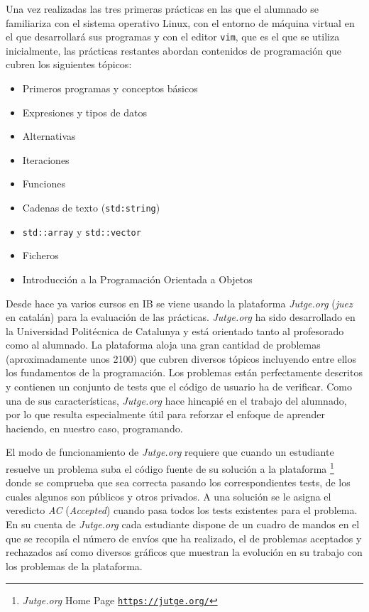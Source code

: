 \documentclass[twocolumn,twoside,a4paper, 10pt]{article}
\newcommand{\jutge}{\textit{Jutge.org}{}}           %
\begin{document}
Una vez realizadas las tres primeras prácticas en las que el alumnado se familiariza con el sistema operativo
Linux, con el entorno de máquina virtual en el que desarrollará sus programas y con el editor \texttt{vim}, 
que es el que se utiliza inicialmente, las prácticas restantes abordan contenidos de programación que
cubren los siguientes tópicos:
\begin{itemize}
  \item Primeros programas y conceptos básicos
  \item Expresiones y tipos de datos
  \item Alternativas
  \item Iteraciones
  \item Funciones
  \item Cadenas de texto (\texttt{std:string})
  \item \texttt{std::array} y \texttt{std::vector}
  \item Ficheros
  \item Introducción a la Programación Orientada a Objetos
\end{itemize}

Desde hace ya varios cursos en IB se viene usando la plataforma \jutge{} (\textit{juez} en catalán) 
\cite{Petit:Jutge:2018} para la evaluación de las prácticas.
\jutge{} ha sido desarrollado en la Universidad Politécnica de Catalunya y está orientado tanto al profesorado 
como al alumnado.
La plataforma aloja una gran cantidad de problemas (aproximadamente unos 2100) que cubren diversos
tópicos incluyendo entre ellos los fundamentos de la programación.
Los problemas están perfectamente descritos y contienen un conjunto de tests que el código de usuario ha de
verificar.
Como una de sus características, \jutge{} hace hincapié en el trabajo del alumnado, por lo que 
resulta especialmente útil para reforzar el enfoque de aprender haciendo, en nuestro caso, programando.

El modo de funcionamiento de \jutge{} requiere que cuando un estudiante resuelve un problema suba el código
fuente de su solución a la plataforma
\footnote{\textit{Jutge.org} Home Page \href{https://jutge.org/}{\scriptsize{\texttt{https://jutge.org/}}}}
donde se comprueba que sea correcta pasando los correspondientes tests, de los cuales algunos son públicos
y otros privados.
A una solución se le asigna el veredicto \textit{AC} (\textit{Accepted}) cuando pasa todos los tests existentes para el problema.
En su cuenta de \jutge{} cada estudiante dispone de un cuadro de mandos en el que se recopila el número de
envíos que ha realizado, el de problemas aceptados y rechazados así como diversos gráficos que muestran la
evolución en su trabajo con los problemas de la plataforma.
\end{document}
